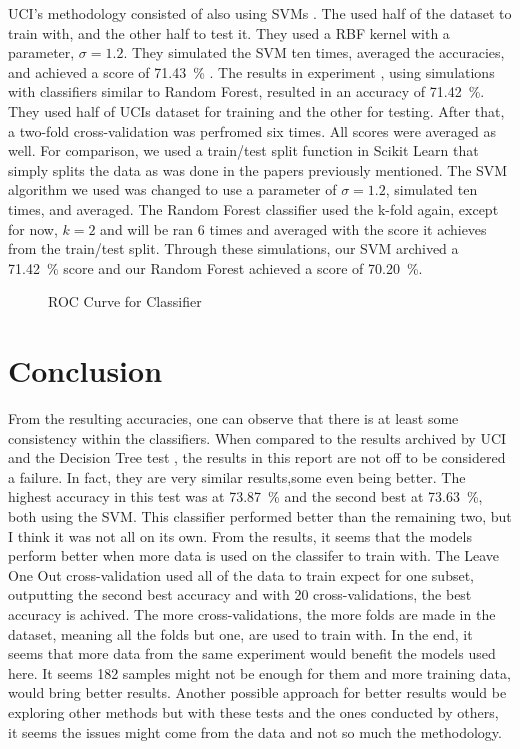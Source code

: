 \documentclass[conference,compsoc]{IEEEtran}
\begin{document}
UCI's methodology consisted of also using SVMs \cite{classsvm}. The used half of the dataset to train with, and the other half to test it. 
They used a RBF kernel with a parameter, $\sigma = 1.2$. They simulated the SVM ten times, averaged the accuracies, and achieved a score of \SI{71.43}{\percent} \cite{classsvm}.
The results in experiment \cite{fuzzy}, using simulations with classifiers similar to Random Forest, resulted in an accuracy of \SI{71.42}{\percent}. They used half of UCIs dataset for training and the other for testing. After that, a two-fold cross-validation was perfromed six times. All scores were averaged as well.  For comparison, we used a train/test split function in Scikit Learn that simply splits the data as was done in the papers previously mentioned. The SVM algorithm we used 
was changed to use a parameter of $\sigma = 1.2$, simulated ten times, and averaged. The Random Forest classifier used the k-fold again, except for now, $k = 2$ and will be 
ran 6 times and averaged with the score it achieves from the train/test split. Through these simulations, our SVM archived a \SI{71.42}{\percent} score and our 
Random Forest achieved a score of \SI{70.20}{\percent}.
\begin{figure}
\caption{ROC Curve for Classifier}
\label{fg:ROC}

\end{figure}

\section{Conclusion}
From the resulting accuracies, one can observe that there is at least some consistency within the classifiers. When compared to the results archived by UCI and the Decision Tree test \cite{fuzzy}, the results in this report are not off to be considered a failure. In fact, they are very similar results,some even being better. The highest accuracy in this test was at \SI{73.87}{\percent} and the second best at \SI{73.63}{\percent}, both using the SVM. 
This classifier performed better than the remaining two, but I think it was not all on its own. From the results, it seems that the models perform better when 
more data is used on the classifer to train with. The Leave One Out cross-validation used all of the data to train expect for one subset, outputting the second 
best accuracy and with 20 cross-validations, the best accuracy is achived. The more cross-validations, the more folds are made in the dataset, meaning all the folds but one, are 
used to train with. In the end, it seems that more data from the same experiment would benefit the models used here. It seems 182 samples might not be enough for them and more training data, would bring better results. 
Another possible approach for better results would be exploring other methods but with these tests and the ones conducted by others, it seems the issues might come from the data and not so much the methodology.




\end{document}

